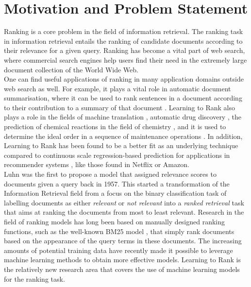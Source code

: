 \section{Motivation and Problem Statement}
\label{sec:motivation}
Ranking is a core problem in the field of information retrieval. The ranking task in information retrieval entails the ranking of candidate documents according to their relevance for a given query. Ranking has become a vital part of web search, where commercial search engines help users find their need in the extremely large document collection of the World Wide Web.\\

One can find useful applications of ranking in many application domains outside web search as well. For example, it plays a vital role in automatic document summarisation, where it can be used to rank sentences in a document according to their contribution to a summary of that document 
\cite{Bravo-Marquez2012}. Learning to Rank also plays a role in the fields of machine translation \cite{Hopkins2011}, automatic drug discovery \cite{Agarwal2010b}, the prediction of chemical reactions in the field of chemistry \cite{Kayala2011}, and it is used to determine the ideal order in a sequence of maintenance operations \cite{Rudin2009}. In addition, Learning to Rank has been found to be a better fit as an underlying technique compared to continuous scale regression-based prediction for applications in recommender systems \cite{Adomavicius2005,McNee2006}, like those found in Netflix or Amazon.\\

Luhn \cite{Luhn1957} was the first to propose a model that assigned relevance scores to documents given a query back in 1957. This started a transformation of the Information Retrieval field from a focus on the binary classification task of labelling documents as either \emph{relevant} or \emph{not relevant} into a \emph{ranked retrieval} task that aims at ranking the documents from most to least relevant. Research in the field of ranking models has long been based on manually designed ranking functions, such as the well-known BM25 model \cite{Robertson1994}, that simply rank documents based on the appearance of the query terms in these documents. The increasing amounts of potential training data have recently made it possible to leverage machine learning methods to obtain more effective models. Learning to Rank is the relatively new research area that covers the use of machine learning models for the ranking task.\\

